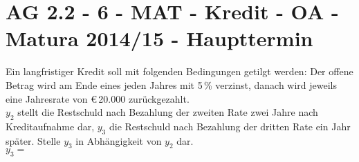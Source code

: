 \section{AG 2.2 - 6 - MAT - Kredit - OA - Matura 2014/15 - Haupttermin}

\begin{beispiel}[AG 2.2]{1} %
Ein langfristiger Kredit soll mit folgenden Bedingungen getilgt werden: Der offene Betrag wird am Ende eines jeden Jahres mit 5\,\% verzinst, danach wird jeweils eine Jahresrate von \euro\,20.000 zurückgezahlt. \\

$y_2$ stellt die Restschuld nach Bezahlung der zweiten Rate zwei Jahre nach Kreditaufnahme dar, $y_3$ die Restschuld nach Bezahlung der dritten Rate ein Jahr später. Stelle $y_3$ in Abhängigkeit von $y_2$ dar. \\

$y_3 =$ 
\end{beispiel}